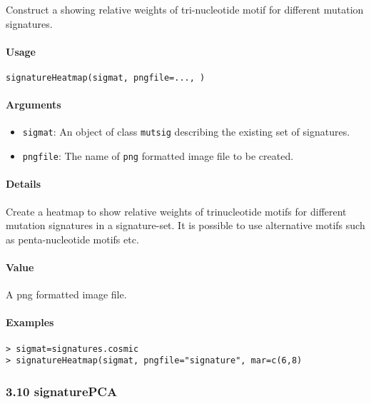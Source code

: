 \documentclass[]{article}
\providecommand{\tightlist}{%
  \setlength{\itemsep}{0pt}\setlength{\parskip}{0pt}}
\let\oldparagraph\paragraph
\renewcommand{\paragraph}[1]{\oldparagraph{#1}\mbox{}}
\begin{document}
Construct a  showing relative weights of tri-nucleotide motif for
different mutation signatures.

\paragraph{\texorpdfstring{\textbf{Usage}}{Usage}}\label{usage-8}

\texttt{signatureHeatmap(sigmat,\ pngfile=...,\ )}

\paragraph{\texorpdfstring{\textbf{Arguments
}}{Arguments }}\label{arguments-7}

\begin{itemize}
\tightlist
\item
  \texttt{sigmat}: An object of class \texttt{mutsig} describing the
  existing set of signatures.
\item
  \texttt{pngfile}: The name of \texttt{png} formatted image file to be
  created.
\end{itemize}

\paragraph{\texorpdfstring{\textbf{Details}}{Details}}\label{details-5}

Create a heatmap to show relative weights of trinucleotide motifs for
different mutation signatures in a signature-set. It is possible to use
alternative motifs such as penta-nucleotide motifs etc.

\paragraph{\texorpdfstring{\textbf{Value}}{Value}}\label{value-6}

A png formatted image file.

\paragraph{\texorpdfstring{\textbf{Examples}}{Examples}}\label{examples-8}

\begin{verbatim}
> sigmat=signatures.cosmic
> signatureHeatmap(sigmat, pngfile="signature", mar=c(6,8)
\end{verbatim}

\subsubsection{3.10 signaturePCA}\label{signaturepca}
\end{document}

